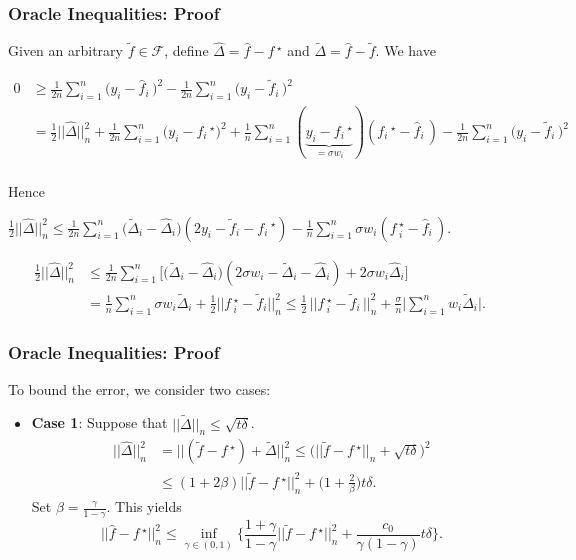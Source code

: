 \documentclass[11pt]{beamer}
\newcommand{\cF}{\mathcal{F}}
\newcommand{\fstar}{f\,^\star}
\newcommand{\fhat}{\widehat{f}}
\newcommand{\ftilde}{\widetilde{f}}
\newcommand{\Dhat}{\widehat{\Delta}}
\newcommand{\Dtilde}{\widetilde{\Delta}}
\begin{document}
	\begin{frame}
	\frametitle{Oracle Inequalities: Proof}
		Given an arbitrary $\ftilde \in \cF$, define $\Dhat = \fhat - \fstar$ and $\Dtilde = \fhat - \ftilde$. We have 
		\begin{small}
		\begin{align*}
			0 &\geq \frac{1}{2n}\sum_{i = 1}^{n} \big(y_i - \fhat_i\,\big)^2 - \frac{1}{2n}\sum_{i = 1}^{n} \big(y_i - \ftilde_i\,\big)^2 \\
			&= \frac{1}{2}||\Dhat||_n^2 +  \frac{1}{2n}\sum_{i = 1}^{n} \big( y_i - {f_i\,^\star}\big)^2 +   \frac{1}{n}\sum_{i = 1}^{n} (\underbrace{y_i - f_i\,^\star}_{= \sigma w_i})(f_i\,^\star - \fhat_i\,)			
			 - \frac{1}{2n}\sum_{i = 1}^{n} \big(y_i - \ftilde_i\,\big)^2\\
		\end{align*}
		\end{small}
		Hence 
		\begin{small}
		$\frac{1}{2}||\Dhat||_n^2 \leq \frac{1}{2n}\sum_{i = 1}^{n} \big(\Dtilde_i - \Dhat_i\big) (2y_i - \ftilde_i - f_i\,^\star) - \frac{1}{n}\sum_{i = 1}^{n}\sigma w_i (\fstar_i - \fhat_i\,)$. 	
		\vspace{-0.5cm}
		
		\begin{align*}
			\frac{1}{2}||\Dhat||_n^2 &\leq \frac{1}{2n}\sum_{i = 1}^{n}\Big[ \big(\Dtilde_i - \Dhat_i\big) (2\sigma w_i - \Dtilde_i - \Dhat_i) + 2\sigma w_i \Dhat_i\Big]\\ 
			&=\frac{1}{n}\sum_{i = 1}^{n}\sigma w_i \Dtilde_i + \frac{1}{2} ||\fstar_i - \ftilde_i||_n^2	 \leq \frac{1}{2} \,||\fstar_i - \ftilde_i\,||_n^2 + \frac{\sigma}{n}\Big|\sum_{i = 1}^{n}w_i \Dtilde_i\Big|.
		\end{align*}
		\end{small}		
	\end{frame}
	
	\begin{frame}
	\frametitle{Oracle Inequalities: Proof}
	To bound the error, we consider two cases:
	\begin{itemize}
		\item \textbf{Case 1}: Suppose that $||\Dtilde||_n \leq \sqrt{t\delta}$.
			\begin{align*}
				||\Dhat||_n^2 &= ||(\ftilde - \fstar) + \Dtilde||_n^2\leq \Big(||\ftilde - \fstar||_n + \sqrt{t\delta}\Big)^2\\ &\leq (1+2\beta) ||\ftilde - \fstar||_n^2 + \big(1 + \frac{2}{\beta}\big)t\delta.				
			\end{align*}
			Set $\beta = \frac{\gamma}{1-\gamma}$. This yields 
			\begin{equation*}
			||\fhat - \fstar||_n^2 \leq \inf_{\gamma \in (0, 1)}\Big\{\frac{1+\gamma}{1-\gamma} ||\ftilde-\fstar||_n^2 + \frac{c_0}{\gamma(1-\gamma)}t\delta\Big\}.
			\end{equation*}
	\end{itemize}
	\end{frame}
\end{document}
